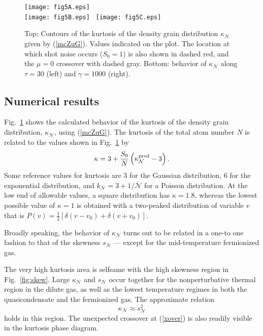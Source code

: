 \documentclass[aps,twocolumn,pra,superscriptaddress,nofootinbib,amsmath,amssymb,floats,floatfix,english]{revtex4-1}
\newcommand{\mc}[1]{{\mathcal{#1}}}
\newcommand{\wb}[1]{{\overline{#1}}}
\newcommand{\eqn}[1]{(\ref{#1})}
\renewcommand{\eq}[2]{\begin{equation}\label{#1}#2\end{equation}}
\begin{document}
\begin{figure}
\begin{center}
\texttt{[image: fig5A.eps]}
\\
\texttt{[image: fig5B.eps]}
\ 
\texttt{[image: fig5C.eps]}
\end{center}
\caption{
Top: Contours of the kurtosis of the density grain distribution $\kappa_{\mc{N}}$ given by \eqn{mcZuG}. Values indicated on the plot. 
The location at which shot noise  occurs ($S_0=1$) is also shown in dashed red, and the  $\mu=0$ crossover with dashed gray.
Bottom: behavior of $\kappa_{\mc{N}}$ along $\tau=30$ (left) and $\gamma=1000$ (right).
}
\label{fig:kurt}
\end{figure}

\subsection{Numerical results}
\label{KRES}


Fig.~\ref{fig:kurt} shows the calculated behavior of the kurtosis of the density grain distribution, $\kappa_{\mc{N}}$, using \eqn{mcZuG}. 
The kurtosis of the total atom number $N$ is related to the values shown in Fig.~\ref{fig:kurt} by
\eq{kfig}{
\kappa=3+\frac{S_0}{N}\left(\kappa^{\rm pred}_{\mc{N}}-3\right).
}
Some reference values for kurtosis are 3 for the Gaussian distribution, 6 for the exponential distribution, and $k_{\mc{N}}=3+1/\wb{\mc{N}}$ for a Poisson distribution. 
At the low end of allowable values, a square distribution has $\kappa=1.8$, whereas the lowest possible value of $\kappa=1$ is obtained with a two-peaked distribution of variable $v$ that is $P(v) = \frac{1}{2}[\delta(v-v_0)+\delta(v+v_0)]$.

Broadly speaking, the behavior of $\kappa_{\mc{N}}$ turns out to be related in a one-to one fashion to that of the skewness $s_{\mc{N}}$ --- except for the mid-temperature fermionized gas.

The very high kurtosis area is selfsame with the high skewness region in Fig.~\ref{fig:skew}. Large $\kappa_{\mc{N}}$ and  $s_{\mc{N}}$ occur together for the nonperturbative thermal region in the dilute gas, as well as the lowest temperature regimes in both the quasicondensate and the fermionized gas. The approximate relation 
\eq{skappa}{
\kappa_{\mc{N}} \approx s_{\mc{N}}^2
}
holds in this region. The unexpected crossover at \eqn{xover} is also readily visible in the kurtosis phase diagram.
\end{document}
